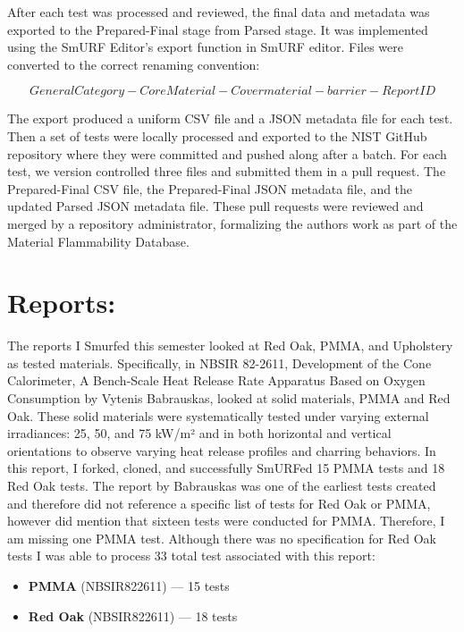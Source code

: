 \documentclass{abstract}
\begin{document}
After each test was processed and reviewed, the final data and metadata was exported to the Prepared-Final stage from Parsed stage. It was implemented using the SmURF Editor’s export function in SmURF editor. Files were converted to the correct renaming convention:

\begin{equation}
GeneralCategory-CoreMaterial-Covermaterial-barrier-ReportID
\end{equation}

The export produced a uniform CSV file and a JSON metadata file for each test. Then a set of tests were locally processed and exported to the NIST GitHub repository where they were committed and pushed along after a batch. For each test, we version controlled three files and submitted them in a pull request. The Prepared-Final CSV file, the Prepared-Final JSON metadata file, and the updated Parsed JSON metadata file. These pull requests were reviewed and merged by a repository administrator, formalizing the authors work as part of the Material Flammability Database.


\section{Reports:}
The reports I Smurfed this semester looked at Red Oak, PMMA, and Upholstery as tested materials. Specifically, in NBSIR 82-2611, Development of the Cone Calorimeter, A Bench-Scale Heat Release Rate Apparatus Based on Oxygen Consumption by Vytenis Babrauskas, looked at solid materials, PMMA and Red Oak. These solid materials were systematically tested under varying external irradiances: 25, 50, and 75 kW/m² and in both horizontal and vertical orientations to observe varying heat release profiles and charring behaviors. In this report, I forked, cloned, and successfully SmURFed 15 PMMA tests and 18 Red Oak tests. The report by Babrauskas was one of the earliest tests created and therefore did not reference a specific list of tests for Red Oak or PMMA, however did mention that sixteen tests were conducted for PMMA. Therefore, I am missing one PMMA test. Although there was no specification for Red Oak tests I was able to process 33 total test associated with this report:

\begin{itemize}
	\item \textbf{PMMA} (NBSIR822611) --- 15 tests
	\item \textbf{Red Oak} (NBSIR822611) --- 18 tests
\end{itemize}
\end{document}
